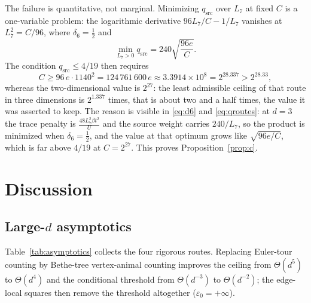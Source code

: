 \documentclass[11pt]{article}
\theoremstyle{plain}
\theoremstyle{definition}
\begin{document}
The failure is quantitative, not marginal. Minimizing $q_{\mathrm{src}}$ over $L_7$
at fixed $C$ is a one-variable problem: the logarithmic derivative $96L_7/C-1/L_7$
vanishes at $L_7^2=C/96$, where $\delta_6=\frac12$ and
\begin{equation}\label{eq:qmin}
 \min_{L_7>0}q_{\mathrm{src}}=240\sqrt{\frac{96e}{C}} .
\end{equation}
The condition $q_{\mathrm{src}}\le4/19$ then requires
\begin{equation}\label{eq:cmin}
 C\ge96\,e\cdot1140^2=124\,761\,600\,e\approx3.3914\times10^{8}=2^{28.337}>2^{28.33},
\end{equation}
whereas the two-dimensional value is $2^{27}$: the least admissible ceiling of that
route in three dimensions is $2^{1.337}$ times, that is about two and a half times,
the value it was asserted to keep.
The reason is visible in \eqref{eq:d6} and \eqref{eq:qroutes}: at $d=3$ the trace
penalty is $\frac{48L_7^2\beta t^2}{U}$ and the source weight carries
$240/L_7$, so the product is minimized when $\delta_6=\frac12$, and the value at that
optimum grows like $\sqrt{96e/C}$, which is far above $4/19$ at $C=2^{27}$. This
proves Proposition~\ref{prop:c}.

\section{Discussion}\label{sec:discussion}

\subsection{\texorpdfstring{Large-$d$ asymptotics}{Large-d asymptotics}}

Table~\ref{tab:asymptotics} collects the four rigorous routes. Replacing Euler-tour
counting by Bethe-tree vertex-animal counting improves the ceiling from
$\Theta(d^5)$ to $\Theta(d^4)$ and the conditional threshold from $\Theta(d^{-3})$ to
$\Theta(d^{-2})$; the edge-local squares then remove the threshold altogether
($\varepsilon_0=+\infty$).
\end{document}
